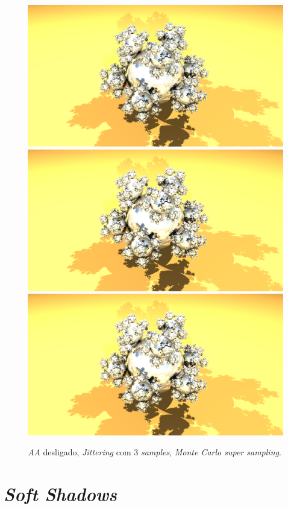 \documentclass{article}
\begin{document}
        \begin{figure}[h!]
            \centering
            \includegraphics[scale=0.08]{aa00}
            \includegraphics[scale=0.08]{aajt}
            \includegraphics[scale=0.08]{aamc}
            \caption{\textit{AA} desligado, \textit{Jittering} com 3 \textit{samples}, \textit{Monte Carlo super sampling}.}
        \end{figure}    

    \section*{\textit{Soft Shadows}}
\end{document}
